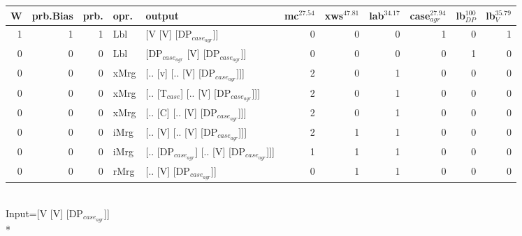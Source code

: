 \begin{tabularx}{\linewidth}{rrrlXrrrrrr}
\hline
   W &   prb.Bias &   prb. & opr.   & output                                    &   mc$^{27.54}$ &   xws$^{47.81}$ &   lab$^{34.17}$ &   case$_{agr}^{27.94}$ &   lb$_{DP}^{100}$ &   lb$_{V}^{35.79}$ \\
\hline
   1 &       1 &   1 & Lbl  & [V [V] [DP$_{case_{agr}}$]]                     &            0 &             0 &             0 &                  1 &                0 &              1 \\
   0 &       0 &   0 & Lbl  & [DP$_{case_{agr}}$ [V] [DP$_{case_{agr}}$]]           &            0 &             0 &             0 &                  0 &                1 &              0 \\
   0 &       0 &   0 & xMrg & [.. [v] [.. [V] [DP$_{case_{agr}}$]]]           &            2 &             0 &             1 &                  0 &                0 &              0 \\
   0 &       0 &   0 & xMrg & [.. [T$_{case}$] [.. [V] [DP$_{case_{agr}}$]]]      &            2 &             0 &             1 &                  0 &                0 &              0 \\
   0 &       0 &   0 & xMrg & [.. [C] [.. [V] [DP$_{case_{agr}}$]]]           &            2 &             0 &             1 &                  0 &                0 &              0 \\
   0 &       0 &   0 & iMrg & [.. [V] [.. [V] [DP$_{case_{agr}}$]]]           &            2 &             1 &             1 &                  0 &                0 &              0 \\
   0 &       0 &   0 & iMrg & [.. [DP$_{case_{agr}}$] [.. [V] [DP$_{case_{agr}}$]]] &            1 &             1 &             1 &                  0 &                0 &              0 \\
   0 &       0 &   0 & rMrg & [.. [V] [DP$_{case_{agr}}$]]                    &            0 &             1 &             1 &                  0 &                0 &              0 \\
\hline
\end{tabularx}\endgroup\\
\begingroup\scriptsize Input=[V [V] [DP$_{case_{agr}}$]]\\*
